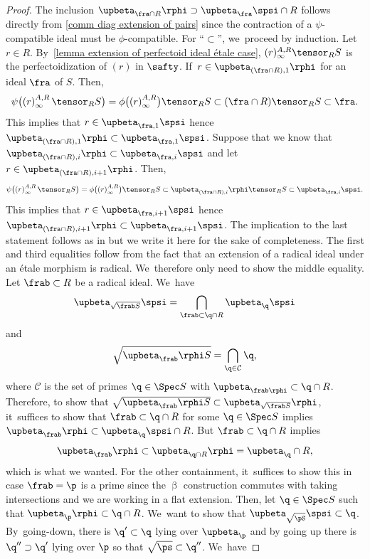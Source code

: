 \begin{proof}
The inclusion $\upbeta_{\fra\cap R}\rphi \supset \upbeta_\fra\spsi\cap R $ follows directly from \autoref{comm diag extension of pairs} since the contraction of a $\psi$-compatible ideal must be $\phi$-compatible. For ``$\subset$'', we~proceed by induction. Let $r\in R$. By~\autoref{lemma extension of perfectoid ideal étale case}, $(r)^{A,R}_\infty \tensor_{R} S$ is the perfectoidization of $(r)$ in $\safty$. If~$r\in \upbeta_{(\fra\cap R),1}\rphi$ for an ideal $\fra$ of $S$.
Then,\vspace*{-3pt}
\[
\psi\bigl(\left(r\right)^{A,R}_\infty \tensor_{R} S\bigr) =\phi\bigl( \left(r\right)^{A,R}_\infty\bigr) \tensor_{R} S \subset (\fra \cap R) \tensor_{R} S \subset \fra.
\]
This implies that $r\in \upbeta_{\fra,1}\spsi$ hence
$\upbeta_{(\fra\cap R),1}\rphi \subset \upbeta_{\fra,1}\spsi$. Suppose that we know that $\upbeta_{(\fra\cap R),i}\rphi \subset \upbeta_{\fra,i}\spsi$ and let $r\in \upbeta_{(\fra\cap R), i+1}\rphi$. Then,\vspace*{-3pt}
\[
\psi\bigl(\left(r\right)^{A,R}_\infty \tensor_{R} S\bigr) =\phi\bigl( \left(r\right)^{A,R}_\infty\bigr) \tensor_{R} S \subset \upbeta_{(\fra\cap R),i}\rphi \tensor_R S \subset \upbeta_{\fra,i}\spsi.
\]
This implies that $r\in \upbeta_{\fra, i+1}\spsi$ hence
$\upbeta_{(\fra\cap R),i+1}\rphi \subset \upbeta_{\fra,i+1}\spsi$.
The implication to the last statement follows as in \cite[Def.-Prop.\,5.5]{CarvajalFayolleTameRamificationCFPS} but we write it here for the sake of completeness. The first and third equalities follow from the fact that an extension of a radical ideal under an étale morphism is radical. We~therefore only need to show the middle equality.
Let $\frab\subset R$ be a radical ideal. We~have\vspace*{-3pt}
\[
\upbeta_{\sqrt{\frab S}}\spsi=\bigcap_{\frab\subset \q\cap R}\upbeta_\q\spsi
\]
and\vspace*{-5pt}
\[
\sqrt{\upbeta_\frab\rphi S}=\bigcap_{\q\in \mathcal{C}} \q,
\]
where $\mathcal{C}$ is the set of primes $\q\in \Spec S$ with $\upbeta_{\frab\rphi}\subset \q\cap R$. Therefore, to show that $\sqrt{\upbeta_\frab\rphi S}\subset \upbeta_{\sqrt{\frab S}}\rphi$, it~suffices to show that $\frab\subset \q\cap R$ for some $\q\in \Spec S$ implies $\upbeta_{\frab}\rphi\subset \upbeta_\q\spsi \cap R$. But $\frab\subset \q\cap R$ implies\vspace*{-3pt}
\[
\upbeta_\frab\rphi\subset\upbeta_{\q\cap R}\rphi=\upbeta_{\q}\cap R,
\]
which is what we wanted. For the other containment, it~suffices to show this in case $\frab=\p$ is a prime since the $\upbeta$ construction commutes with taking intersections and we are working in a flat extension. Then, let $\q\in \Spec S$ such that $\upbeta_\p\rphi\subset \q\cap R$. We~want to show that $\upbeta_{\sqrt{\pS}}\spsi \subset \q$. By~going-down, there is $\q'\subset \q$ lying over $\upbeta_\p$ and by going up there is $\q''\supset \q'$ lying over $\p$ so that $\sqrt{\ps}\subset \q''$. We~have\vspace*{-3pt}

\end{proof}
